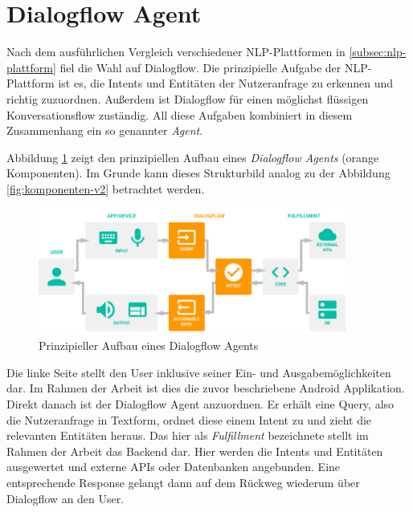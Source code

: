 \clearpage
\section{Dialogflow Agent}
\label{sec:dialogflow-agent}

Nach dem ausführlichen Vergleich verschiedener \ac{NLP}-Plattformen in  \ref{subsec:nlp-plattform} fiel die Wahl auf Dialogflow. Die prinzipielle Aufgabe der \ac{NLP}-Plattform ist es, die Intents und Entitäten der Nutzeranfrage zu erkennen und richtig zuzuordnen. Außerdem ist Dialogflow für einen möglichst flüssigen Konversationsflow zuständig. All diese Aufgaben kombiniert in diesem Zusammenhang ein so genannter \textit{Agent}. 

Abbildung \ref{fig:dialogflow-agent-overview} zeigt den prinzipiellen Aufbau eines \textit{Dialogflow Agents} (orange Komponenten). Im Grunde kann dieses Strukturbild analog zu der Abbildung \ref{fig:komponenten-v2} betrachtet werden. 
\newline

\begin{figure}[H]
    \centering
    \includegraphics[width=0.9\textwidth]{bilder/dialogflow-agent.png}
    \caption{Prinzipieller Aufbau eines Dialogflow Agents \cite{google_cloud_agents_2018}}
    \label{fig:dialogflow-agent-overview}
\end{figure}

Die linke Seite stellt den User inklusive seiner Ein- und Ausgabemöglichkeiten dar. Im Rahmen der Arbeit ist dies die zuvor beschriebene Android Applikation. Direkt danach ist der Dialogflow Agent anzuordnen. Er erhält eine Query, also die Nutzeranfrage in Textform, ordnet diese einem Intent zu und zieht die relevanten Entitäten heraus. Das hier als \textit{Fulfillment} bezeichnete stellt im Rahmen der Arbeit das Backend dar. Hier werden die Intents und Entitäten ausgewertet und externe \acp{API} oder Datenbanken angebunden. Eine entsprechende Response gelangt dann auf dem Rückweg wiederum über Dialogflow an den User. 

